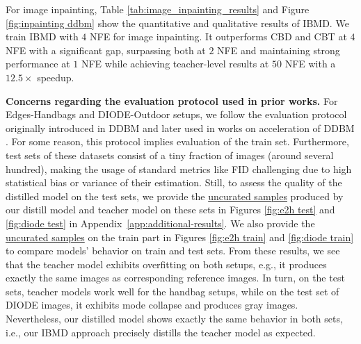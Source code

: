 For image inpainting, Table \ref{tab:image_inpainting_results} and Figure \ref{fig:inpainting ddbm} show the quantitative and qualitative results of IBMD. 
We train IBMD with $4$ NFE for image inpainting. It outperforms CBD and CBT at $4$ NFE with a significant gap, surpassing both at $2$ NFE and maintaining strong performance at $1$ NFE while achieving teacher-level results at $50$ NFE with a $12.5\times$ speedup.

\textbf{Concerns regarding the evaluation protocol used in prior works.}
For Edges-Handbags and DIODE-Outdoor setups, we follow the evaluation protocol originally introduced in DDBM \citep{zhou2024denoising} and later used in works on acceleration of DDBM \cite{zheng2024diffusion, he2024consistency}.
For some reason, this protocol implies evaluation of the train set. Furthermore, test sets of these datasets consist of a tiny fraction of images (around several hundred), making the usage of standard metrics like FID challenging due to high statistical bias or variance of their estimation. Still, to assess the quality of the distilled model on the test sets, we provide the \underline{uncurated samples} produced by our distill model and teacher model on these sets in Figures \ref{fig:e2h test} and \ref{fig:diode test} in Appendix~\ref{app:additional-results}. We also provide the \underline{uncurated samples} on the train part in Figures \ref{fig:e2h train} and \ref{fig:diode train} to compare models' behavior on train and test sets. From these results, we see that the teacher model exhibits overfitting on both setups, e.g., it produces exactly the same images as corresponding reference images. In turn, on the test sets, teacher models work well for the handbag setups, while on the test set of DIODE images, it exhibits mode collapse and produces gray images. Nevertheless, our distilled model shows exactly the same behavior in both sets, i.e., our IBMD approach precisely distills the teacher model as expected.




